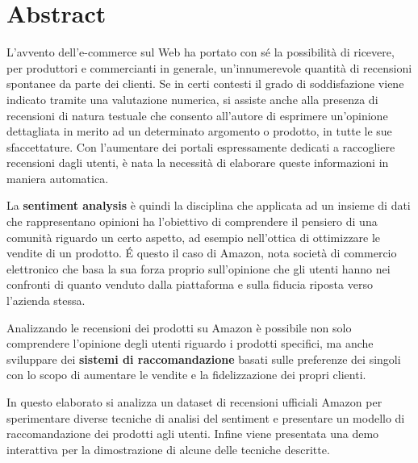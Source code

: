 \documentclass[hidelinks, 12pt]{article}
\begin{document}


\null{}


\section*{\centering Abstract}

L'avvento dell'e-commerce sul Web ha portato con sé la possibilità di ricevere, per produttori e commercianti in generale, un'innumerevole quantità di recensioni spontanee da parte dei clienti. Se in certi contesti il grado di soddisfazione viene indicato tramite una valutazione numerica, si assiste anche alla presenza di recensioni di natura testuale che consento all'autore di esprimere un'opinione dettagliata in merito ad un determinato argomento o prodotto, in tutte le sue sfaccettature. Con l'aumentare dei portali espressamente dedicati a raccogliere recensioni dagli utenti, è nata la necessità di elaborare queste informazioni in maniera automatica. 

La \textbf{sentiment analysis} è quindi la disciplina che applicata ad un insieme di dati che rappresentano opinioni ha l'obiettivo di comprendere il pensiero di una comunità riguardo un certo aspetto, ad esempio nell'ottica di ottimizzare le vendite di un prodotto. É questo il caso di Amazon, nota società di commercio elettronico che basa la sua forza proprio sull'opinione che gli utenti hanno nei confronti di quanto venduto dalla piattaforma e sulla fiducia riposta verso l'azienda stessa.

Analizzando le recensioni dei prodotti su Amazon è possibile non solo comprendere l'opinione degli utenti riguardo i prodotti specifici, ma anche sviluppare dei \textbf{sistemi di raccomandazione} basati sulle preferenze dei singoli con lo scopo di aumentare le vendite e la fidelizzazione dei propri clienti.

In questo elaborato si analizza un dataset di recensioni ufficiali Amazon per sperimentare diverse tecniche di analisi del sentiment e presentare un modello di raccomandazione dei prodotti agli utenti. Infine viene presentata una demo interattiva per la dimostrazione di alcune delle tecniche descritte.


 \null

\clearpage


\end{document}
